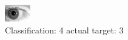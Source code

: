 \begin{figure}[h!]
\begin{center}
\includegraphics[width=0.60\columnwidth]{figures/ID260_class_4_target_3.png}
\end{center}
\caption{ Classification: 4 actual target: 3}
\label{fig:ID260_class_4_target_3}
\end{figure}
